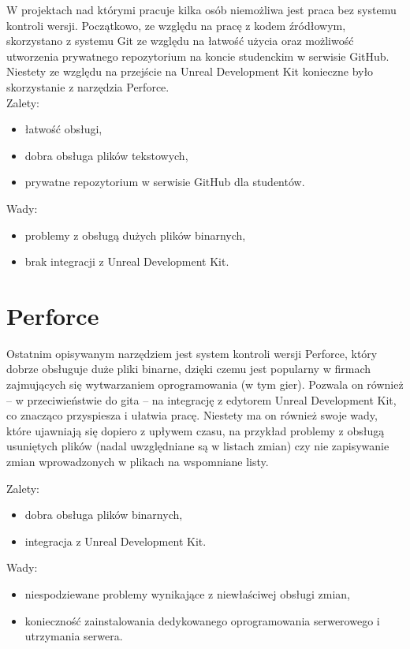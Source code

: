 W projektach nad którymi pracuje kilka osób niemożliwa jest praca bez systemu kontroli wersji. Początkowo, ze względu na pracę z kodem źródłowym, skorzystano z systemu Git ze względu na łatwość użycia oraz możliwość utworzenia prywatnego repozytorium na koncie studenckim w serwisie GitHub. Niestety ze względu na przejście na Unreal Development Kit konieczne było skorzystanie z narzędzia Perforce.\\

Zalety:
\begin{itemize}
\item łatwość obsługi,
\item dobra obsługa plików tekstowych,
\item prywatne repozytorium w serwisie GitHub dla studentów.
\end{itemize}

Wady:
\begin{itemize}
\item problemy z obsługą dużych plików binarnych,
\item brak integracji z Unreal Development Kit.
\end{itemize}

\section{Perforce}

Ostatnim opisywanym narzędziem jest system kontroli wersji Perforce, który dobrze obsługuje duże pliki binarne, dzięki czemu jest popularny w firmach zajmujących się wytwarzaniem oprogramowania (w tym gier). Pozwala on również -- w przeciwieństwie do gita -- na integrację z edytorem Unreal Development Kit, co znacząco przyspiesza i ułatwia pracę. Niestety ma on również swoje wady, które ujawniają się dopiero z upływem czasu, na przykład problemy z obsługą usuniętych plików (nadal uwzględniane są w listach zmian) czy nie zapisywanie zmian wprowadzonych w plikach na wspomniane listy.

Zalety:
\begin{itemize}
\item dobra obsługa plików binarnych,
\item integracja z Unreal Development Kit.
\end{itemize}

Wady:
\begin{itemize}
\item niespodziewane problemy wynikające z niewłaściwej obsługi zmian,
\item konieczność zainstalowania dedykowanego oprogramowania serwerowego i utrzymania serwera.
\end{itemize}